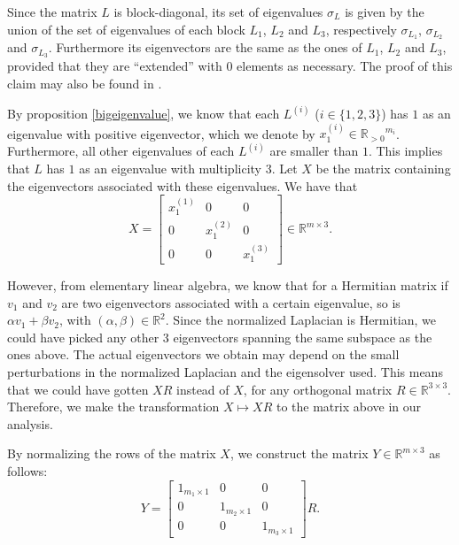 Since the matrix $L$ is block-diagonal, its set of eigenvalues $\sigma _L$ is given by the union of the set of eigenvalues of each block $L_1$, $L_2$ and $L_3$, respectively $\sigma_{L_1}$, $\sigma_{L_2}$ and $\sigma_{L_3}$.
Furthermore its eigenvectors are the same as the ones of $L_1$, $L_2$ and $L_3$, provided that they are ``extended'' with $0$ elements as necessary. 
The proof of this claim may also be found in \cite{mahoney}.

By proposition \ref{bigeigenvalue}, we know that each $L^{(i)}$ ($i \in \{1, 2, 3 \}$) has $1$ as an eigenvalue with positive eigenvector, which we denote by $x_1^{(i)} \in {\mathbb R_{>0}}^{m_i} $. Furthermore, all other eigenvalues of each $L^{(i)}$ are smaller than $1$.
This implies that $L$ has $1$ as an eigenvalue with multiplicity $3$.
Let $X$ be the matrix containing the eigenvectors associated with these eigenvalues. We have that 
\begin{equation}
   X =
   \begin{bmatrix}
      x_1^{(1)} & 0 & 0 \\
      0 & x_1^{(2)} & 0 \\
      0 & 0 & x_1^{(3)}
   \end{bmatrix}
   \in \mathbb R^{m \times 3}.
\end{equation}

However, from elementary linear algebra, we know that for a Hermitian matrix if $v_1$ and $v_2$ are two eigenvectors associated with a certain eigenvalue, so is $\alpha v_1 + \beta v_2$, with $(\alpha, \beta) \in \mathbb R ^2$.
Since the normalized Laplacian is Hermitian, we could have picked any other $3$ eigenvectors spanning the same subspace as the ones above.
The actual eigenvectors we obtain may depend on the small perturbations in the normalized Laplacian and the eigensolver used.
This means that we could have gotten $XR$ instead of $X$, for any orthogonal matrix $R \in \mathbb{R}^{3 \times 3}$.
Therefore, we make the transformation $X \longmapsto XR$ to the matrix above in our analysis.

By normalizing the rows of the matrix $X$, we construct the matrix $Y \in \mathbb{R}^{m \times 3}$ as follows:
\begin{equation}\label{y}
   Y = 
   \begin{bmatrix}
      1_{m_1 \times 1} & 0 & 0 \\
      0 & 1_{m_2 \times 1} & 0 \\
      0 & 0 & 1_{m_3 \times 1} 
   \end{bmatrix}R.
\end{equation}

